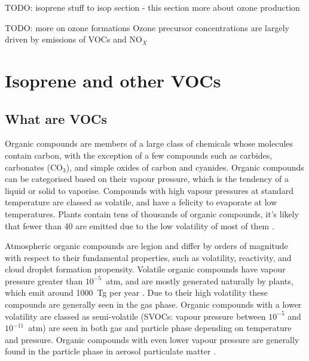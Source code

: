     TODO: isoprene stuff to isop section - this section more about ozone production
    
    TODO: more on ozone formations
    Ozone precursor concentrations are largely driven by emissions of VOCs and NO$_X$
    
    

\section{Isoprene and other VOCs}
  \subsection{What are VOCs}
    Organic compounds are members of a large class of chemicals whose molecules contain carbon, with the exception of a few compounds such as carbides, carbonates (CO$_3$), and simple oxides of carbon and cyanides.
    Organic compounds can be categorised based on their vapour pressure, which is the tendency of a liquid or solid to vaporise.
    Compounds with high vapour pressures at standard temperature are classed as volatile, and have a felicity to evaporate at low temperatures.
    Plants contain tens of thousands of organic compounds, it's likely that fewer than 40 are emitted due to the low volatility of most of them \citep{Guenther2000}.
    
    Atmospheric organic compounds are legion and differ by orders of magnitude with respect to their fundamental properties, such as volatility, reactivity, and cloud droplet formation propensity.
    Volatile organic compounds have vapour pressure greater than $10^{-5}$~atm, and are mostly generated naturally by plants, which emit around 1000~Tg per year \citep{Guenther1995, Glasius2016}.
    Due to their high volatility these compounds are generally seen in the gas phase.
    Organic compounds with a lower volatility are classed as semi-volatile (SVOCs: vapour pressure between $10^{-5}$ and $10^{-11}$~atm) are seen in both gas and particle phase depending on temperature and pressure.
    Organic compounds with even lower vapour pressure are generally found in the particle phase in aerosol particulate matter \citep{Glasius2016}.
    
